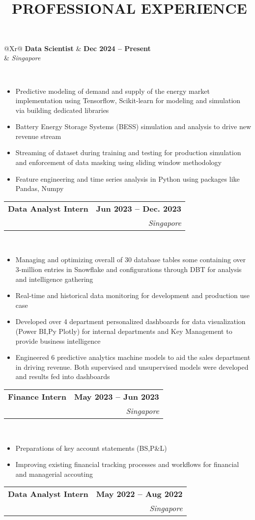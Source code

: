 \documentclass[10pt,a4paper]{article}
\makeatletter
\newcommand{\cvsectionfontsize}{11}       %
\newcommand{\cvtaglinefirstfontsize}{11}  %
\newcommand{\cvtaglinesecondfontsize}{10} %
\newcommand{\cvbulletfontsize}{10}        %
\newcommand{\cvsection}[3][.2em]{
  \vspace{-2.7em} %
  \section[#3]{\textbf{\scalebox{.68}{\faIcon{#2}}~\fontsize{\cvsectionfontsize}{\cvsectionfontsize}\selectfont\MakeUppercase{#3}}}
  \vspace{-1.8em}
  \noindent\makebox[\textwidth]{\rule{\textwidth}{0.4pt}}
  \\
  \vspace{#1} %
}
\newcommand{\cvtagline}[5][1em]{
  \vspace{-1em} %
  \noindent\begin{tabularx}{\textwidth}{@{}Xr@{}}
    {\fontsize{\cvtaglinefirstfontsize}{\cvtaglinefirstfontsize}\selectfont\textbf{#2}} & 
    {\fontsize{\cvtaglinefirstfontsize}{\cvtaglinefirstfontsize}\selectfont\textbf{#3}} \\ %
    {\fontsize{\cvtaglinesecondfontsize}{\cvtaglinesecondfontsize}\selectfont{#4}} & 
    {\fontsize{\cvtaglinesecondfontsize}{\cvtaglinesecondfontsize}\selectfont\textit{#5}} \\ %
  \end{tabularx}
  \\
  \vspace{#1} %
}
\newcommand{\cvbullets}[2][1em]{
  \vspace{-2.1em} %
  {\fontsize{\cvbulletfontsize}{\cvbulletfontsize}\selectfont
    \begin{itemize}[left=0pt,labelsep=1em]
      \setlength\itemsep{0.2em} %
      \setlength\labelwidth{1em} %
      \setlength\parskip{0pt} %
      #2
    \end{itemize}
  }
  \vspace{#1} %
}
\makeatother
\begin{document}
\cvsection{briefcase}{Professional Experience}

\cvtagline{Data Scientist}{Dec 2024 -- Present}{Flo Energy Pte Ltd $ | $ Supervisor: Nils Trepstra [Head of Data & Analytics]}{Singapore}

\cvbullets{
  \item Predictive modeling of demand and supply of the energy market implementation using Tensorflow, Scikit-learn for modeling and simulation via building dedicated libraries
  \item Battery Energy Storage Systems (BESS) simulation and analysis to drive new revenue stream
  \item Streaming of dataset during training and testing for production simulation and enforcement of data masking using sliding window methodology
  \item Feature engineering and time series analysis in Python using packages like Pandas, Numpy }

\cvtagline{Data Analyst Intern}{Jun 2023 -- Dec. 2023}{ADDX Pte Ltd $ | $ Supervisor: Yogesh Bharadwaj [Data team lead]}{Singapore}

\cvbullets{
  \item Managing and optimizing overall of 30 database tables some containing over
  3-million entries in Snowflake and configurations through DBT for analysis and
  intelligence gathering
  \item Real-time and historical data monitoring for development and production use
  case
  \item Developed over 4 department personalized dashboards for data visualization
  (Power BI,Py Plotly) for internal departments and Key Management to provide
  business intelligence
  \item Engineered 6 predictive analytics machine models to aid the sales department in
  driving revenue. Both supervised and unsupervised models were developed and
  results fed into dashboards }

\cvtagline{Finance Intern}{May 2023 -- Jun 2023}{Wiz.AI Pte Ltd $ | $ Supervisor: Andy Teo [Finance director]}{Singapore}

\cvbullets{
  \item Preparations of key account statements (BS,P\&L)
  \item Improving existing financial tracking processes and workflows for financial and
  managerial accouting }

\cvtagline{Data Analyst Intern}{May 2022 -- Aug 2022}{REANGLE Pte Ltd  [Sustainability]  $ | $ Supervisor: Kazu Watanabe [CEO]}{Singapore}
\end{document}
